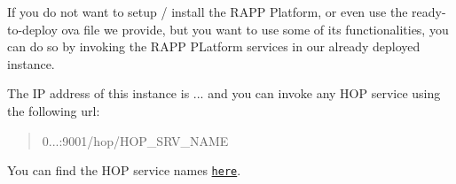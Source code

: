 If you do not want to setup / install the R\-A\-P\-P Platform, or even use the ready-\/to-\/deploy ova file we provide, but you want to use some of its functionalities, you can do so by invoking the R\-A\-P\-P P\-Latform services in our already deployed instance.

The I\-P address of this instance is {...} and you can invoke any H\-O\-P service using the following url\-:

\begin{quotation}
0...\-:9001/hop/\-H\-O\-P\-\_\-\-S\-R\-V\-\_\-\-N\-A\-M\-E

\end{quotation}


You can find the H\-O\-P service names \href{https://github.com/rapp-project/rapp-platform/wiki/RAPP-HOP-services}{\tt here}. 